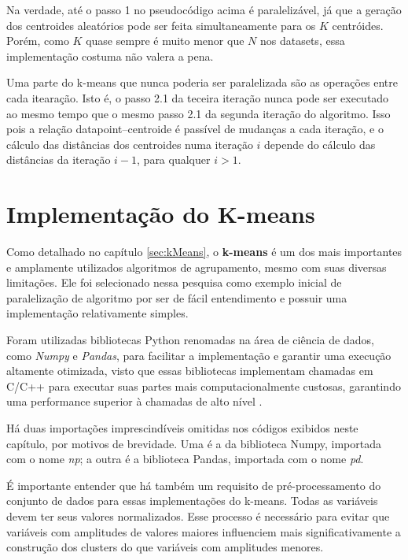 \documentclass[12pt,
openright, 
oneside, %
a4paper,    %
brazil]{facom-ufu-abntex2}
\begin{document}
Na verdade, até o passo 1 no pseudocódigo acima é paralelizável, já que a geração dos centroides aleatórios pode ser feita simultaneamente para os $K$ centróides. Porém, como $K$ quase sempre é muito menor que $N$ nos datasets, essa implementação costuma não valera a pena.

Uma parte do k-means que nunca poderia ser paralelizada são as operações entre cada itearação. Isto é, o passo 2.1 da teceira iteração nunca pode ser executado ao mesmo tempo que o mesmo passo 2.1 da segunda iteração do algoritmo. Isso pois a relação datapoint--centroide é passível de mudanças a cada iteração, e o cálculo das distâncias dos centroides numa iteração $i$ depende do cálculo das distâncias da iteração $i-1$, para qualquer $i > 1$.





\section{Implementação do K-means}
\label{sec:kMeansImplementações}

Como detalhado no capítulo \ref{sec:kMeans}, o \textbf{k-means} é um dos mais importantes e amplamente utilizados algoritmos de agrupamento, mesmo com suas diversas limitações. Ele foi selecionado nessa pesquisa como exemplo inicial de paralelização de algoritmo por ser de fácil entendimento e possuir uma implementação relativamente simples.

Foram utilizadas bibliotecas Python renomadas na área de ciência de dados, como \textit{Numpy} e \textit{Pandas}, para facilitar a implementação e garantir uma execução altamente otimizada, visto que essas bibliotecas implementam chamadas em C/C++ para executar suas partes mais computacionalmente custosas, garantindo uma performance superior à chamadas de alto nível \cite{sciPyAndNumpy2012}.

Há duas importações imprescindíveis omitidas nos códigos exibidos neste capítulo, por motivos de brevidade. Uma é a da biblioteca Numpy, importada com o nome \textit{np}; a outra é a biblioteca Pandas, importada com o nome \textit{pd}.

É importante entender que há também um requisito de pré-processamento do conjunto de dados para essas implementações do k-means. Todas as variáveis devem ter seus valores normalizados. Esse processo é necessário para evitar que variáveis com amplitudes de valores maiores influenciem mais significativamente a construção dos clusters do que variáveis com amplitudes menores.
\end{document}
